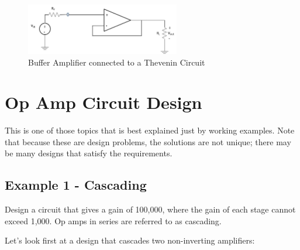 \documentclass{handout}
\begin{document}
\begin{figure} [h!]
\centering
\includegraphics[width=0.6\textwidth]{Buffer.jpg}
\caption{Buffer Amplifier connected to a Thevenin Circuit}
\label{fig: Buffer}
\end{figure}

\newpage
\clearpage
\pagebreak

\section{Op Amp Circuit Design}
This is one of those topics that is best explained just by working examples. Note that because these are design problems, the solutions are not unique; there may be many designs that satisfy the requirements.

\subsection{Example 1 - Cascading}
Design a circuit that gives a gain of 100,000, where the gain of each stage cannot exceed 1,000. Op amps in series are referred to as cascading.



Let's look first at a design that cascades two non-inverting amplifiers:
\end{document}
